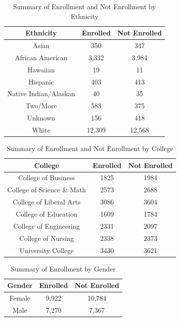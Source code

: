 \documentclass[12pt,english]{report}
\begin{document}
\begin{table}[ht]
\centering
\caption{Summary of Enrollment and Not Enrollment by Ethnicity}
\label{ethnicity}
\begin{tabular}{|c|c|c|}
\hline
Ethnicity             & Enrolled & Not Enrolled \\ \hline
Asian                 & 350      & 347          \\ \hline
African American      & 3,332     & 3,984         \\ \hline
Hawaiian              & 19       & 11           \\ \hline
Hispanic              & 403      & 413          \\ \hline
Native Indian/Alaskan & 40       & 35           \\ \hline
Two/More              & 583      & 375          \\ \hline
Unknown               & 156      & 418          \\ \hline
White                 & 12,309    & 12,568        \\ \hline
\end{tabular}
\end{table}

\begin{table}[h]
\centering
\caption{Summary of Enrollment and Not Enrollment by College}
\label{college}
\begin{tabular}{|c|c|c|}
\hline
College                    & Enrolled & Not Enrolled \\ \hline
College of Business        & 1825     & 1984         \\ \hline
College of Science \& Math & 2573     & 2688         \\ \hline
College of Liberal Arts    & 3086     & 3604         \\ \hline
College of Education       & 1609     & 1784         \\ \hline
College of Engineering     & 2331     & 2097         \\ \hline
College of Nursing         & 2338     & 2373         \\ \hline
University College         & 3430     & 3621         \\ \hline
\end{tabular}
\end{table}

\begin{table}[h]
\centering
\begin{tabular}{|c|c|c|}
\hline
Gender & Enrolled & Not Enrolled \\ \hline
Female  & 9,922     & 10,784        \\ \hline
Male   & 7,270     & 7,367         \\ \hline
\end{tabular}
\caption{Summary of Enrollment by Gender}
\label{enroll_gender}
\end{table}
\end{document}
